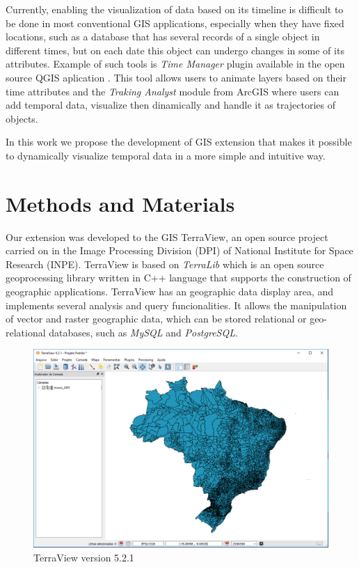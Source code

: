 \documentclass[12pt]{article}
\begin{document}
Currently, enabling the visualization of data based on its timeline is difficult to be done in most conventional GIS applications, especially when they have fixed locations, such as a database that has several records of a single object in different times, but on each date this object can undergo changes in some of its attributes. Example of such tools is 
 \textit{Time Manager} plugin available in the open source QGIS aplication \cite{qgis}. This tool  allows users to animate layers based on their time attributes and the \textit{Traking Analyst} module from ArcGIS \cite{arcgis} where users can add temporal data, visualize then dinamically and handle it as trajectories of objects.

In this work we propose the development of GIS extension that makes it possible to dynamically visualize temporal data in a more simple and intuitive way.

\section{Methods and Materials}

Our extension was developed to the GIS TerraView, an open source project carried on in the  Image Processing Division (DPI) of National Institute for Space Research (INPE). TerraView is based on  \textit{TerraLib} which is an open source geoprocessing library written in C++ language that supports the construction of geographic applications. TerraView has an geographic data display area, and implements several analysis and query funcionalities. It allows the manipulation of vector and raster geographic data, which can be stored relational or geo-relational databases, such as \textit{MySQL} and \textit{PostgreSQL}.

\begin{figure}[ht]
\centering
\includegraphics[width=.6\textwidth]{terraview.png}
\caption{TerraView version 5.2.1}
\label{fig:terraviewLayout}
\end{figure}
\end{document}
